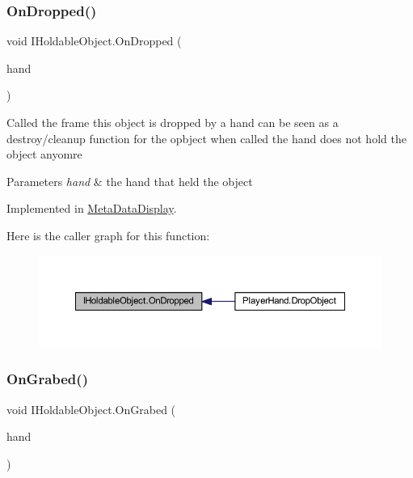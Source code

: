 \subsubsection{\texorpdfstring{On\+Dropped()}{OnDropped()}}
{\footnotesize\ttfamily void I\+Holdable\+Object.\+On\+Dropped (\begin{DoxyParamCaption}\item[{\mbox{\hyperlink{class_player_hand}{Player\+Hand}}}]{hand }\end{DoxyParamCaption})}



Called the frame this object is dropped by a hand can be seen as a destroy/cleanup function for the opbject when called the hand does not hold the object anyomre 


\begin{DoxyParams}{Parameters}
{\em hand} & the hand that held the object\\
\hline
\end{DoxyParams}


Implemented in \mbox{\hyperlink{class_meta_data_display_a274478924e6a4df19484a469ae2869ce}{Meta\+Data\+Display}}.

Here is the caller graph for this function\+:
\nopagebreak
\begin{figure}[H]
\begin{center}
\leavevmode
\includegraphics[width=350pt]{interface_i_holdable_object_a19523673c41505d8533aa50b957e95a1_icgraph}
\end{center}
\end{figure}
\mbox{\label{interface_i_holdable_object_a7b8a42a0c12a26b1668c4dd904f38355}} 
\subsubsection{\texorpdfstring{On\+Grabed()}{OnGrabed()}}
{\footnotesize\ttfamily void I\+Holdable\+Object.\+On\+Grabed (\begin{DoxyParamCaption}\item[{\mbox{\hyperlink{class_player_hand}{Player\+Hand}}}]{hand }\end{DoxyParamCaption})}



